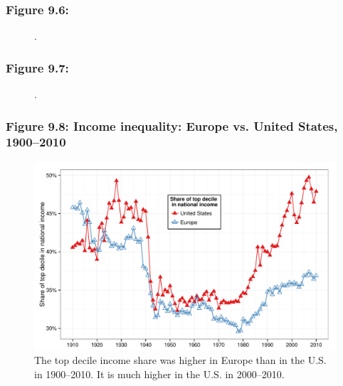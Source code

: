 \documentclass[t]{beamer}\usepackage[]{graphicx}\usepackage[]{color}
\newenvironment{knitrout}{}{} %
\begin{document}
\begin{frame}[label=Figure_9_6]
\frametitle{Figure 9.6: }
\begin{figure}[t]
\begin{minipage}[b]{\textwidth}
\centering

\caption{.}
\end{minipage}
\end{figure}
\end{frame}


\begin{frame}[label=Figure_9_7]
\frametitle{Figure 9.7: }
\begin{figure}[t]
\begin{minipage}[b]{\textwidth}
\centering

\caption{.}
\end{minipage}
\end{figure}
\end{frame}


\begin{frame}[label=Figure_9_8]
\frametitle{Figure 9.8: Income inequality: Europe vs. United States, 1900--2010}
\begin{figure}[t]
\begin{minipage}[b]{\textwidth}
\centering
\begin{knitrout}\footnotesize
{}\color{fgcolor}

{\centering \includegraphics[width=1\linewidth]{figures/color/Figure_9_8} 

}



\end{knitrout}
\caption{The top decile income share was higher in Europe than in the U.S. in 1900--2010. It is much higher in the U.S. in 2000--2010.}
\end{minipage}
\end{figure}
\end{frame}
\end{document}
